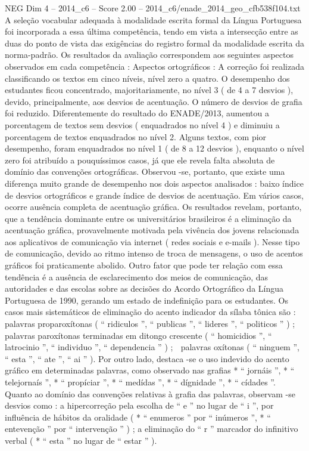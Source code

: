 \begin{textsample}{NEG Dim 4 – 2014\_c6 – Score 2.00 – 2014\_c6/enade\_2014\_geo\_cfb538f104.txt}
A seleção vocabular adequada à modalidade escrita formal da Língua Portuguesa foi incorporada a essa última competência, tendo em vista a intersecção entre as duas do ponto de vista das exigências do registro formal da modalidade escrita da norma-padrão.
Os resultados da avaliação correspondem aos seguintes aspectos observados em cada competência : Aspectos ortográficos : A correção foi realizada classificando os textos em cinco níveis, nível zero a quatro.
O desempenho dos estudantes ficou concentrado, majoritariamente, no nível 3 ( de 4 a 7 desvios ), devido, principalmente, aos desvios de acentuação.
O número de desvios de grafia foi reduzido.
Diferentemente do resultado do ENADE/2013, aumentou a porcentagem de textos sem desvios ( enquadrados no nível 4 ) e diminuiu a porcentagem de textos enquadrados no nível 2.
Alguns textos, com pior desempenho, foram enquadrados no nível 1 ( de 8 a 12 desvios ), enquanto o nível zero foi atribuído a pouquíssimos casos, já que ele revela falta absoluta de domínio das convenções ortográficas.
Observou -se, portanto, que existe uma diferença muito grande de desempenho nos dois aspectos analisados : baixo índice de desvios ortográficos e grande índice de desvios de acentuação.
Em vários casos, ocorre ausência completa de acentuação gráfica.
Os resultados revelam, portanto, que a tendência dominante entre os universitários brasileiros é a eliminação da acentuação gráfica, provavelmente motivada pela vivência dos jovens relacionada aos aplicativos de comunicação via internet ( redes sociais e e-mails ).
Nesse tipo de comunicação, devido ao ritmo intenso de troca de mensagens, o uso de acentos gráficos foi praticamente abolido.
Outro fator que pode ter relação com essa tendência é a ausência de esclarecimento dos meios de comunicação, das autoridades e das escolas sobre as decisões do Acordo Ortográfico da Língua Portuguesa de 1990, gerando um estado de indefinição para os estudantes.
Os casos mais sistemáticos de eliminação do acento indicador da sílaba tônica são :  palavras proparoxítonas ( “ ridiculos ”, “ publicas ”, “ lideres ”, “ politicos ” ) ;  palavras paroxítonas terminadas em ditongo crescente ( “ homicidios ”, “ latrocinio ”, “ individuo ”, “ dependencia ” ) ;  palavras oxítonas ( “ ninguem ”, “ esta ”, “ ate ”, “ ai ” ).
Por outro lado, destaca -se o uso indevido do acento gráfico em determinadas palavras, como observado nas grafias * “ jornáis ”, * “ telejornaís ”, * “ propíciar ”, * “ medídas ”, * “ dígnidade ”, * “ cídades ”.
Quanto ao domínio das convenções relativas à grafia das palavras, observam -se desvios como : a hipercorreção pela escolha de “ e ” no lugar de “ i ”, por influência de hábitos da oralidade ( * “ enumeros ” por “ inúmeros ”, * “ entevenção ” por “ intervenção ” ) ; a eliminação do “ r ” marcador do infinitivo verbal ( * “ esta ” no lugar de “ estar ” ).

\end{textsample}

